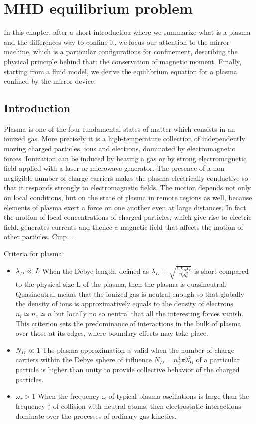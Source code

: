 \chapter{MHD equilibrium problem}\label{chapter:GS}
In this chapter, after a short introduction where we summarize what is a plasma and the differences way to confine it, we focus our attention to the mirror machine, which is a particular configurations for confinement, describing the physical principle behind that: the conservation of magnetic moment. Finally, starting from a fluid model, we derive the equilibrium equation for a plasma confined by the mirror device.

\section{Introduction}\label{sec:introduction}
Plasma is one of the four fundamental states of matter which consists in an ionized gas. More precisely it is a high-temperature collection of independently moving charged particles, ions and electrons, dominated by electromagnetic forces. Ionization can be induced by heating a gas or by strong electromagnetic field applied with a laser or microwave generator. The presence of a non-negligible number of charge carriers makes the plasma electrically conductive so that it responds strongly to electromagnetic fields. The motion depends not only on local conditions, but on the state of plasma in remote regions as well, because elements of plasma exert a force on one another even at large distances. In fact the motion of local concentrations of charged particles, which give rise to electric field, generates currents and thence a magnetic field that affects the motion of other particles. Cmp. \cite{CHEN}.
\medskip

Criteria for plasma:
\begin{itemize}
  \item $\lambda_D\ll L$ When the Debye length, defined as $\lambda_D=\sqrt{\frac{\epsilon_0 k_B T_e}{n_eq_e^2}}$ is short compared to the physical size L of the plasma, then the plasma is quasineutral. Quasineutral means that the ionized gas is neutral enough so that globally the density of ions is approximatively equals to the density of electrons $n_i\simeq n_e\simeq n$ but locally no so neutral that all the interesting forces vanish. This criterion sets the predominance of interactions in the bulk of plasma over those at its edges, where boundary effects may take place.
  \item $N_D\ll 1$ The plasma approximation is valid when the number of charge carriers within the Debye sphere of influence $N_D=n\frac{4}{3}\pi\lambda_D^3$ of a particular particle is higher than unity to provide collective behavior of the charged particles.
  \item $\omega_{\tau}>1$ When the frequency $\omega$ of typical plasma oscillations is large than the frequency $\frac{1}{\tau}$ of collision with neutral atoms, then electrostatic interactions dominate over the processes of ordinary gas kinetics.
\end{itemize}

